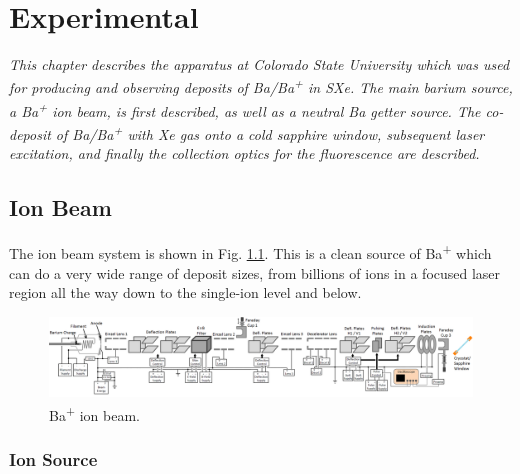\chapter{Experimental}


\noindent
\emph{This chapter describes the apparatus at Colorado State University which was used for producing and observing  deposits of Ba/Ba\textsuperscript{+} in SXe.  The main barium source, a Ba\textsuperscript{+} ion beam, is first described, as well as a neutral Ba getter source.  The co-deposit of Ba/Ba\textsuperscript{+} with Xe gas onto a cold sapphire window, subsequent laser excitation, and finally the collection optics for the fluorescence are described.}

\section{Ion Beam}

The ion beam system is shown in Fig. \ref{fig:ionbeam}.  This is a clean source of Ba\textsuperscript{+} which can do a very wide range of deposit sizes, from billions of ions in a focused laser region all the way down to the single-ion level and below.

\begin{figure} %
        \centering
                \includegraphics[angle=90,width=.25\textwidth]{figures/ionBeam.png}
                \caption{Ba\textsuperscript{+} ion beam.}
\label{fig:ionbeam}
\end{figure}

\subsection{Ion Source}


